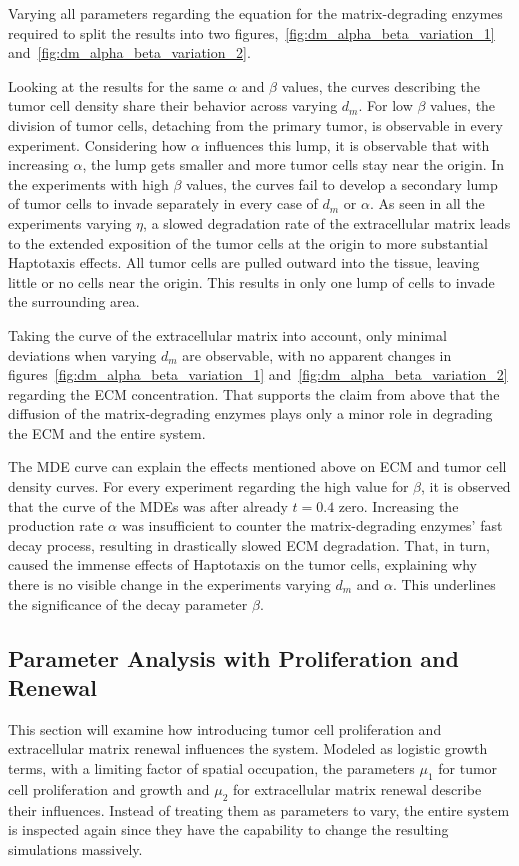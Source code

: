 Varying all parameters regarding the equation for the matrix-degrading enzymes required to split the results into two figures,~\ref{fig:dm_alpha_beta_variation_1} and~\ref{fig:dm_alpha_beta_variation_2}.

Looking at the results for the same $\alpha$ and $\beta$ values, the curves describing the tumor cell density share their behavior across varying $d_m$. For low $\beta$ values, the division of tumor cells, detaching from the primary tumor, is observable in every experiment. Considering how $\alpha$ influences this lump, it is observable that with increasing $\alpha$, the lump gets smaller and more tumor cells stay near the origin. In the experiments with high $\beta$ values, the curves fail to develop a secondary lump of tumor cells to invade separately in every case of $d_m$ or $\alpha$. As seen in all the experiments varying $\eta$, a slowed degradation rate of the extracellular matrix leads to the extended exposition of the tumor cells at the origin to more substantial Haptotaxis effects. All tumor cells are pulled outward into the tissue, leaving little or no cells near the origin. This results in only one lump of cells to invade the surrounding area.

Taking the curve of the extracellular matrix into account, only minimal deviations when varying $d_m$ are observable, with no apparent changes in figures~\ref{fig:dm_alpha_beta_variation_1} and~\ref{fig:dm_alpha_beta_variation_2} regarding the ECM concentration. That supports the claim from above that the diffusion of the matrix-degrading enzymes plays only a minor role in degrading the ECM and the entire system.

The MDE curve can explain the effects mentioned above on ECM and tumor cell density curves. For every experiment regarding the high value for $\beta$, it is observed that the curve of the MDEs was after already $t=0.4$ zero. Increasing the production rate $\alpha$ was insufficient to counter the matrix-degrading enzymes' fast decay process, resulting in drastically slowed ECM degradation. That, in turn, caused the immense effects of Haptotaxis on the tumor cells, explaining why there is no visible change in the experiments varying $d_m$ and $\alpha$. This underlines the significance of the decay parameter $\beta$.


\subsection{Parameter Analysis with Proliferation and Renewal}
This section will examine how introducing tumor cell proliferation and extracellular matrix renewal influences the system. Modeled as logistic growth terms, with a limiting factor of spatial occupation, the parameters $\mu_1$ for tumor cell proliferation and growth and $\mu_2$ for extracellular matrix renewal describe their influences. Instead of treating them as parameters to vary, the entire system is inspected again since they have the capability to change the resulting simulations massively.

